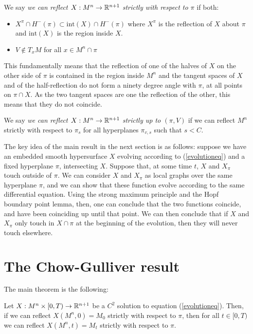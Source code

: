 \begin{defin}
	We say {\em we can reflect $X: M^n\rightarrow \mathbb{R}^{n+1}$ strictly with respect to $\pi$} if both:
	\begin{itemize}
		\item $X^\pi\cap H^-(\pi)\subset \mathrm{int}(X)\cap H^-(\pi)$ where $X^\pi$ is the reflection of $X$ about $\pi$ and $\mathrm{int}(X)$ is the region inside $X$.
		\item $V\notin T_xM$ for all $x\in M^n \cap\pi$
	\end{itemize} 
\end{defin}
This fundamentally means that the reflection of one of the halves of $X$ on the other side of $\pi$ is contained in the region inside $M^n$ and the tangent spaces of $X$ and of the half-reflection do not form a ninety degree angle with $\pi$, at all points on $\pi\cap X$. As the two tangent spaces are one the reflection of the other, this means that they do not coincide.   
\begin{defin}
	We say {\em we can reflect $X: M^n\rightarrow \mathbb{R}^{n+1}$ strictly up to $(\pi,V)$} if we can reflect $M^n$ strictly with respect to $\pi_s$ for all hyperplanes $\pi_{v, s}$ such that $s<C$.  
\end{defin}

The key idea of the main result in the next section is as follows: suppose we have an embedded smooth hypersurface $X$ evolving according to (\ref{evolutioneq}) and a fixed hyperplane $\pi$, intersecting $X$. Suppose that, at some time $t$, $X$ and  $X_\pi$ touch outside of $\pi$. We can consider $X$ and  $X_\pi$ as local graphs over the same hyperplane $\pi$, and we can show that these function evolve according to the same differential equation. Using the strong maximum principle and the Hopf boundary point lemma, then, one can conclude that the two functions coincide, and have been coinciding up until that point. We can then conclude that if  $X$ and  $X_\pi$ only touch in $X\cap\pi$ at the beginning of the evolution, then they will never touch elsewhere.  


\section{The Chow-Gulliver result}

The main theorem is the following: 

\begin{theorem}\label{chow gulliver}
	Let $X:M^n\times [0,T) \rightarrow \mathbb{R}^{n+1}$ be a $C^2$ solution to equation (\ref{evolutioneq}). Then, if we can reflect $X(M^n, 0)=M_0$ strictly with respect to $\pi$, then for all $t\in [0,T)$ we can reflect $X(M^n, t)=M_t$ strictly with respect to $\pi$. 
\end{theorem}

